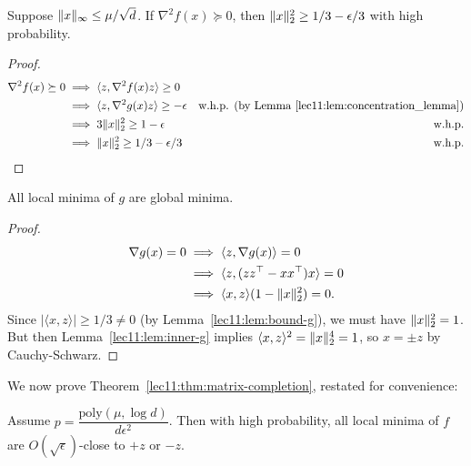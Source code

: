 \begin{lemma}\label{lec11:lem:bound-f}
    Suppose $\|x\|_\infty \leq \mu / \sqrt{d}$. If $\nabla^2 f(x) \succeq 0$, then $\|x\|_2^2 \geq 1/3 - \epsilon/3$ with high probability.
\end{lemma}
\begin{proof}
\begin{align}
    \nabla^2 f(x) \succeq 0
    &\implies \langle z, \nabla^2 f(x)z \rangle \geq 0 \\
    &\implies \langle z, \nabla^2g(x)z \rangle \geq -\epsilon & \text{w.h.p. (by Lemma \ref{lec11:lem:concentration_lemma})} \\
    &\implies 3\|x\|_2^2 \geq 1-\epsilon & \text{w.h.p.} \\
    &\implies \|x\|_2^2 \geq 1/3 - \epsilon/3 & \text{w.h.p.}
\end{align}
\end{proof}

\begin{lemma}
    All local minima of $g$ are global minima.
\end{lemma}

\begin{proof}
\begin{align}
    \nabla g(x) = 0
    & \implies \langle z, \nabla g(x) \rangle = 0 \\
    & \implies \langle z, (zz^\top-xx^\top)x \rangle = 0 \\
    & \implies \langle x,z\rangle (1-\|x\|_2^2) = 0.
\end{align}
Since $|\langle x,z \rangle| \geq 1/3 \neq 0$ (by Lemma~\ref{lec11:lem:bound-g}), we must have $\|x\|_2^2 = 1$. But then Lemma~\ref{lec11:lem:inner-g} implies $\langle x, z\rangle^2 = \|x\|_2^4 = 1$, so $x = \pm z$ by Cauchy-Schwarz.
\end{proof}

We now prove Theorem~\ref{lec11:thm:matrix-completion}, restated for convenience:
\begin{theorem}
Assume $p = \dfrac{\textrm{poly}(\mu, \log d)}{d\epsilon^2}$. Then with high probability, all local minima of $f$ are $O(\sqrt{\epsilon})$-close to $+z$ or $-z$.
\end{theorem}

